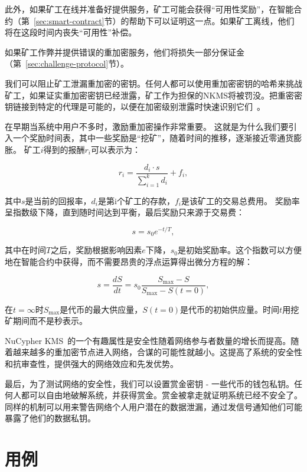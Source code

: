 \documentclass[longbibliography,nofootinbib]{revtex4-1}
\newcommand{\kms}{NuCypher KMS}
\begin{document}
\begin{CJK*}{UTF8}{gbsn}
	此外，如果矿工在线并准备好提供服务，矿工可能会获得“可用性奖励”，在智能合约（第~\ref{sec:smart-contract}节）的帮助下可以证明这一点。如果矿工离线，他们将在这段时间内丧失“可用性”补偿。
    
	如果矿工作弊并提供错误的重加密服务，他们将损失一部分保证金（第~\ref{sec:challenge-protocol}节）。
    
    我们可以阻止矿工泄漏重加密的密钥。任何人都可以使用重加密密钥的哈希来挑战矿工，如果证实重加密密钥已经泄露，矿工作为担保的NKMS将被罚没。把重密密钥链接到特定的代理是可能的，以便在加密级别泄露时快速识别它们~\cite{Libert2008}。
    
    在早期当系统中用户不多时，激励重加密操作非常重要。 这就是为什么我们要引入一个奖励时间表，其中一些奖励是“挖矿”，随着时间的推移，逐渐接近零通货膨胀。 矿工$i$得到的报酬$r_i$可以表示为：
    
\begin{equation}
    r_i = \frac{d_i \cdot s}{\sum_{i=1}^k d_i} + f_i,
\end{equation}

	其中$s$是当前的回报率，$d_i$是第i个矿工的存款，$f_i$是该矿工的交易总费用。 奖励率呈指数级下降，直到随时间达到平衡，最后奖励只来源于交易费：
    
\begin{equation}
    s = s_0 e^{-t/T},
\end{equation}

	其中在时间$T$之后，奖励根据影响因素$e$下降，$s_0$是初始奖励率。这个指数可以方便地在智能合约中获得，而不需要昂贵的浮点运算得出微分方程的解：
    
\begin{equation}
    s = \frac{dS}{dt}= s_0 \frac{S_{\max} - S}{S_{\max} - S(t=0)},
\end{equation}

	在$t=\infty$时$S_{\max}$是代币的最大供应量，$S(t=0)$是代币的初始供应量。时间$t$用挖矿期间而不是秒表示。

	\kms~的一个有趣属性是安全性随着网络参与者数量的增长而提高。随着越来越多的重加密节点进入网络，合谋的可能性就越小。这提高了系统的安全性和抗审查性，提供强大的网络效应和先发优势。
    
    最后，为了测试网络的安全性，我们可以设置赏金密钥 - 一些代币的钱包私钥。任何人都可以自由地破解系统，并获得赏金。赏金被拿走就证明系统已经不安全了。同样的机制可以用来警告网络个人用户潜在的数据泄漏，通过发信号通知他们可能暴露了他们的数据私钥。


\section{用例}


\end{CJK*}
\end{document}

